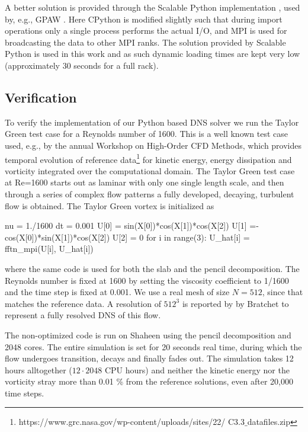 \documentclass[11pt, oneside]{article}
\begin{document}
A better solution is provided through the Scalable Python implementation \cite{scalablepython, Enkovaara201117}, used by, e.g., GPAW \cite{gpaw05}. Here CPython is modified slightly such that during import operations only a single process performs the actual I/O, and MPI is used for broadcasting the data to other MPI ranks. The solution provided by Scalable Python is used in this work and as such dynamic loading times are kept very low (approximately 30 seconds for a full rack).

\subsection{Verification}
\label{sec:verification}
To verify the implementation of our Python based DNS solver we run the Taylor Green test case for a Reynolds number of 1600. This is a well known test case used, e.g., by the annual Workshop on High-Order CFD Methods, which provides temporal evolution of reference data\footnote{https://www.grc.nasa.gov/wp-content/uploads/sites/22/ C3.3$\_$datafiles.zip} for kinetic energy, energy dissipation and vorticity integrated over the computational domain. The Taylor Green test case at Re=1600 starts out as laminar with only one single length scale, and then through a series of complex flow patterns a fully developed, decaying, turbulent flow is obtained. The Taylor Green vortex is initialized as
\begin{python}
nu = 1./1600
dt = 0.001
U[0] = sin(X[0])*cos(X[1])*cos(X[2])
U[1] =-cos(X[0])*sin(X[1])*cos(X[2])
U[2] = 0
for i in range(3):
    U_hat[i] = fftn_mpi(U[i], U_hat[i])
\end{python}
where the same code is used for both the slab and the pencil decomposition. The Reynolds number is fixed at 1600 by setting the viscosity coefficient to 1/1600 and the time step is fixed at 0.001. We use a real mesh of size $N=512$, since that matches the reference data. A resolution of $512^3$ is reported by by Bratchet \cite{brachet1991direct} to represent a fully resolved DNS of this flow.

The non-optimized code is run on Shaheen using the pencil decomposition and 2048 cores. The entire simulation is set for 20 seconds real time, during which the flow undergoes transition, decays and finally fades out. The simulation takes 12 hours alltogether ($12\cdot2048$ CPU hours) and neither the kinetic energy nor the vorticity stray more than 0.01 \% from the reference solutions, even after 20,000 time steps.
\end{document}
